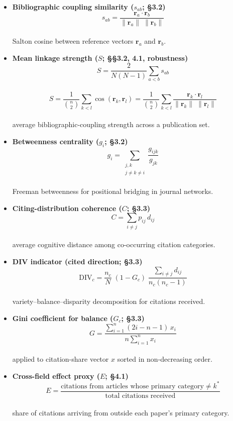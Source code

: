\documentclass[
  10pt,
  twocolumn,
]{article}
\begin{document}
\begin{itemize}
\item
  \textbf{Bibliographic coupling similarity (\(s_{ab}\); §3.2)}\\
  \[ s_{ab} = \frac{\mathbf{r}_a \cdot \mathbf{r}_b}{\|\mathbf{r}_a\|\;\|\mathbf{r}_b\|} \]\\
  Salton cosine between reference vectors \(\mathbf{r}_a\) and
  \(\mathbf{r}_b\).
\item
  \textbf{Mean linkage strength (\(S\); §§3.2, 4.1, robustness)}\\
  \[ S = \frac{2}{N(N-1)} \sum_{a < b} s_{ab} \]\\
  \[ S = \frac{1}{\binom{n}{2}} \sum_{k < l} \cos(\mathbf{r}_k, \mathbf{r}_l) = \frac{1}{\binom{n}{2}} \sum_{k < l} \frac{\mathbf{r}_k \cdot \mathbf{r}_l}{\|\mathbf{r}_k\|\;\|\mathbf{r}_l\|} \]\\
  average bibliographic-coupling strength across a publication set.
\item
  \textbf{Betweenness centrality (\(g_i\); §3.2)}\\
  \[ g_i = \sum_{\substack{j,k \\ j \neq k \neq i}} \frac{g_{ijk}}{g_{jk}} \]\\
  Freeman betweenness for positional bridging in journal networks.
\item
  \textbf{Citing-distribution coherence (\(C\); §3.3)}\\
  \[ C = \sum_{i \neq j} p_{ij}\,d_{ij} \]\\
  average cognitive distance among co-occurring citation categories.
\item
  \textbf{DIV indicator (cited direction; §3.3)}\\
  \[ \text{DIV}_c = \frac{n_c}{N}\;(1 - G_c)\; \frac{\displaystyle\sum_{i \neq j} d_{ij}}{n_c(n_c - 1)} \]\\
  variety--balance--disparity decomposition for citations received.
\item
  \textbf{Gini coefficient for balance (\(G_c\); §3.3)}\\
  \[ G = \frac{\displaystyle\sum_{i=1}^{n}(2i - n - 1)\,x_i}{n\displaystyle\sum_{i=1}^{n} x_i} \]\\
  applied to citation-share vector \(x\) sorted in non-decreasing order.
\item
  \textbf{Cross-field effect proxy (\(E\); §4.1)}\\
  \[ E = \frac{\text{citations from articles whose primary category} \neq k^*}{\text{total citations received}} \]\\
  share of citations arriving from outside each paper's primary
  category.
\end{itemize}
\end{document}
